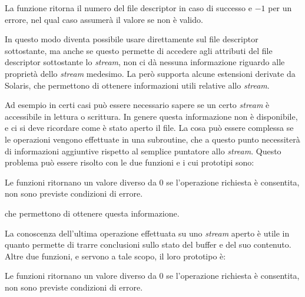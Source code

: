 \begin{funcproto}{
}

{La funzione ritorna il numero del file descriptor in caso di successo e $-1$
  per un errore, nel qual caso  assumerà il valore 
  se  non è valido.}
\end{funcproto}

In questo modo diventa possibile usare direttamente  sul file
descriptor sottostante, ma anche se questo permette di accedere agli attributi
del file descriptor sottostante lo \textit{stream}, non ci dà nessuna
informazione riguardo alle proprietà dello \textit{stream} medesimo.  La
 però supporta alcune estensioni derivate da Solaris, che
permettono di ottenere informazioni utili relative allo \textit{stream}.

Ad esempio in certi casi può essere necessario sapere se un certo
\textit{stream} è accessibile in lettura o scrittura. In genere questa
informazione non è disponibile, e ci si deve ricordare come è stato aperto il
file. La cosa può essere complessa se le operazioni vengono effettuate in una
subroutine, che a questo punto necessiterà di informazioni aggiuntive rispetto
al semplice puntatore allo \textit{stream}. Questo problema può essere risolto
con le due funzioni  e  i cui
prototipi sono:

\begin{funcproto}{
}

{Le funzioni ritornano un valore diverso da $0$ se l'operazione richiesta è
  consentita, non sono previste condizioni di errore.}  
\end{funcproto}

\noindent che permettono di ottenere questa informazione.

La conoscenza dell'ultima operazione effettuata su uno \textit{stream} aperto
è utile in quanto permette di trarre conclusioni sullo stato del buffer e del
suo contenuto. Altre due funzioni,  e 
servono a tale scopo, il loro prototipo è:

\begin{funcproto}{
}

{Le funzioni ritornano un valore diverso da $0$ se l'operazione richiesta è
  consentita, non sono previste condizioni di errore.}
\end{funcproto}

